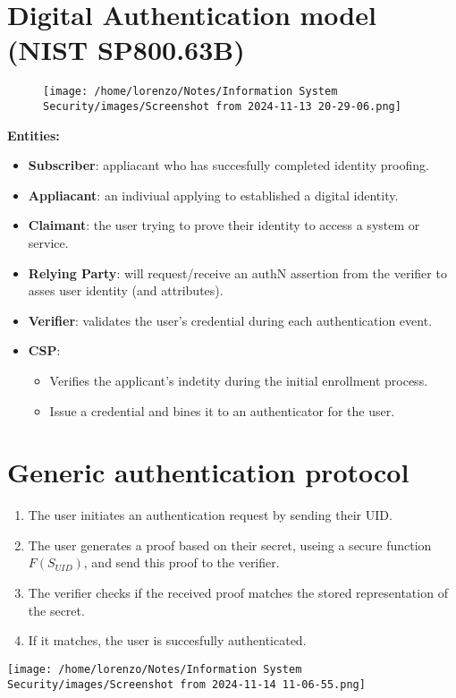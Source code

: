 \section{Digital Authentication model (NIST SP800.63B)}
\begin{figure}[H]
    \centering
    \texttt{[image: /home/lorenzo/Notes/Information System Security/images/Screenshot from 2024-11-13 20-29-06.png]}
\end{figure}
\textbf{Entities:}
\begin{itemize}
    \item \textbf{Subscriber}: appliacant who has succesfully completed identity proofing.
    \item \textbf{Appliacant}: an indiviual applying to established a digital identity.
    \item \textbf{Claimant}: the user trying to prove their identity to access a system or service.
    \item \textbf{Relying Party}: will request/receive an authN assertion from the verifier to asses user identity (and attributes).
    \item \textbf{Verifier}: validates the user's credential during each authentication event. 
    \item \textbf{CSP}: 
        \begin{itemize}
            \item Verifies the applicant's indetity during the initial enrollment process. 
            \item Issue a credential and bines it to an authenticator for the user.
        \end{itemize} 
\end{itemize}


\section{Generic authentication protocol}
\begin{minipage}{0.5\textwidth}
    \begin{enumerate}
        \item The user initiates an authentication request by sending their UID.
        \item The user generates a proof based on their secret, useing a secure function \(F(S_{UID})\), and send this proof to the verifier.
        \item The verifier checks if the received proof matches the stored representation of the secret.
        \item If it matches, the user is succesfully authenticated.
    \end{enumerate}
\end{minipage} 
\hspace{1cm}
\begin{minipage}{0.5\textwidth}
    \centering
    \texttt{[image: /home/lorenzo/Notes/Information System Security/images/Screenshot from 2024-11-14 11-06-55.png]}
\end{minipage}



